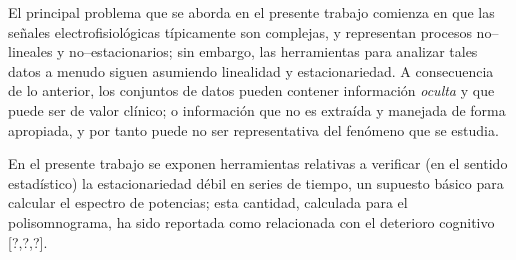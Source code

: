 
El principal problema que se aborda en el presente trabajo comienza en que las señales
electrofisiológicas típicamente son complejas, y representan procesos no--lineales y 
no--estacionarios; sin embargo, las herramientas para analizar tales datos a menudo siguen 
asumiendo linealidad y estacionariedad.
A consecuencia de lo anterior, los conjuntos de datos pueden contener
información \textit{oculta} y que puede ser de valor clínico; o información que no es extraída y 
manejada de forma apropiada, y por tanto puede no ser representativa del fenómeno que se estudia. 

En el presente trabajo se exponen herramientas relativas a verificar (en el sentido estadístico)
la estacionariedad débil en series de tiempo, un supuesto básico para calcular el espectro de potencias; esta cantidad,
calculada para el polisomnograma,
ha sido reportada como relacionada con el deterioro cognitivo [?,?,?].



